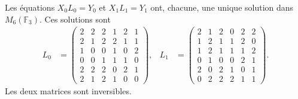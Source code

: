 \begin{theorem}
\label{act21:thm:df-elevaciones-reconstruidas}
Les équations \(X_0L_0=Y_0\) et \(X_1L_1=Y_1\) ont, chacune, une
unique solution dans \(M_6(\mathbb F_3)\). Ces solutions sont
\begin{align*}
 L_0&=\begin{pmatrix}
2&2&2&1&2&1\\2&1&2&2&1&1\\1&0&0&1&0&2\\
0&0&1&1&1&0\\2&2&2&0&2&1\\2&1&2&1&0&0
\end{pmatrix},&
 L_1&=\begin{pmatrix}
2&1&2&0&2&2\\1&2&1&1&2&0\\1&2&1&1&1&2\\
0&1&0&0&2&1\\2&0&2&1&0&1\\0&2&2&2&1&1
\end{pmatrix}.
\end{align*}
Les deux matrices sont inversibles.
\end{theorem}

